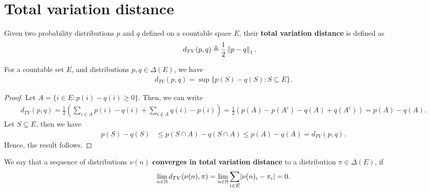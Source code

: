 \documentclass[a4paper,10pt,english]{article}
\begin{document}
\section{Total variation distance}
Given two probability distributions $p$ and $q$ defined on a countable space $E$, their \textbf{total variation distance} is defined as
\begin{align*}
d_{TV}(p,q) &\triangleq \dfrac{1}{2}\left\lVert p-q\right\rVert_1.
\end{align*}
\begin{lem} For a countable set $E$, and distributions $p, q \in \Delta(E)$, we have 
\begin{align*}
d_{TV}(p,q) = \sup\{ p(S) - q(S) : S \subseteq E \}.
\end{align*}
\end{lem}
\begin{proof} 
Let $A = \{ i \in E : p(i) - q(i) \geq 0 \}$. 
Then, we can write
\begin{align*}
d_{TV}(p,q) = \frac{1}{2}\left(\sum_{i \in A}p(i) - q(i) + \sum_{i \notin A} q(i) - p(i) \right)= \frac{1}{2}\left(p(A) - p(A^c) - q(A) + q(A^c) \right) = p(A)-q(A).
\end{align*}
Let $S \subseteq E$, then we have
\begin{align*}
p(S)-q(S) &\leq p(S\cap A) - q(S \cap A) \leq p(A) - q(A) = d_{TV}(p,q).
\end{align*}
Hence, the result follows.
\end{proof}
We say that a sequence of distributions %
$\nu(n)$ \textbf{converges in total variation distance} to a distribution $\pi \in \Delta(E)$, 
if %
\begin{align*}
\lim_{n \in \mathbb{N}} d_{TV}(\nu(n), \pi) = \lim_{n \in \mathbb{N}} \sum_{i \in E} \lvert\nu(n)_i - \pi_i\rvert = 0.
\end{align*} 
\end{document}
